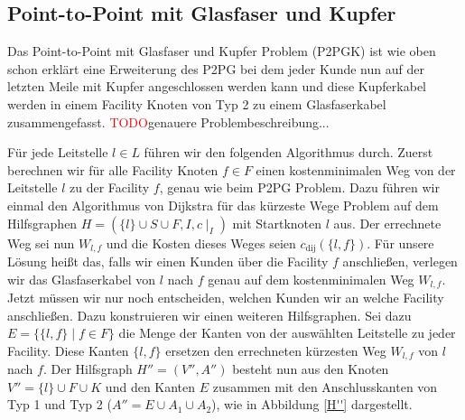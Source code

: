 \documentclass[11pt,a4paper]{article}
\newcommand{\TODO}{\textcolor{red}{TODO}}
\theoremstyle{my_th_style1}
\begin{document}
\subsection{Point-to-Point mit Glasfaser und Kupfer}
Das Point-to-Point mit Glasfaser und Kupfer Problem (P2PGK) ist wie oben schon erklärt eine Erweiterung des P2PG bei dem jeder Kunde nun auf der letzten Meile mit Kupfer angeschlossen werden kann und diese Kupferkabel werden in einem Facility Knoten von Typ 2 zu einem Glasfaserkabel zusammengefasst. \TODO genauere Problembeschreibung...


Für jede Leitstelle $l \in L$ führen wir den folgenden Algorithmus durch.
Zuerst berechnen wir für alle Facility Knoten $f \in F$ einen kostenminimalen Weg von der Leitstelle $l$ zu der Facility $f$, genau wie beim P2PG Problem. Dazu führen wir einmal den Algorithmus von Dijkstra für das kürzeste Wege Problem auf dem Hilfsgraphen $H=(\{l\} \cup S \cup F , I,c\mid_I)$ mit Startknoten $l$ aus. Der errechnete Weg sei nun $W_{l,f}$ und die Kosten dieses Weges seien $c_{\text{dij}}(\{l,f\})$.
Für unsere Lösung heißt das, falls wir einen Kunden über die Facility $f$ anschließen, verlegen wir das Glasfaserkabel von $l$ nach $f$ genau auf dem kostenminimalen Weg $W_{l,f}$.  Jetzt müssen wir nur noch entscheiden, welchen Kunden wir an welche Facility anschließen.
Dazu konstruieren wir einen weiteren Hilfsgraphen. Sei dazu $E=\{\{l,f  \} \mid f \in F  \}$ die Menge der Kanten von der auswählten Leitstelle zu jeder Facility. Diese Kanten $\{l,f\}$ ersetzen den errechneten kürzesten Weg $W_{l,f}$ von $l$ nach $f$. Der Hilfsgraph $H''=(V'',A'')$ besteht nun aus den Knoten $V''=\{l\} \cup F \cup K$ und den Kanten $E$ zusammen mit den Anschlusskanten von Typ 1 und Typ 2 ($A''=E \cup A_1 \cup A_2$), wie in Abbildung \ref{H''} dargestellt.
\end{document}
